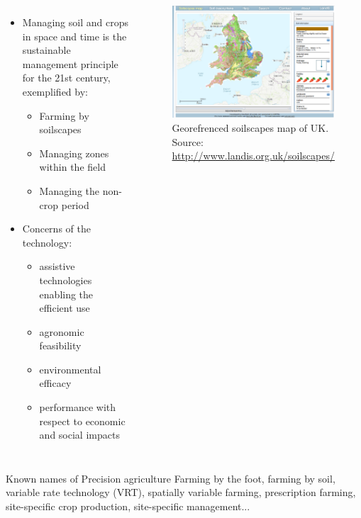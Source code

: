 \documentclass[11pt,dvipsnames,ignorenonframetext,aspectratio=169]{beamer}
\begin{document}
\begin{frame}{}
\protect\hypertarget{section-1}{}
\begin{columns}[T, onlytextwidth]
\begin{itemize}
\small
\item Managing soil and crops in space and time is the sustainable management principle for the 21st century, exemplified by:
  \begin{itemize}
  \footnotesize
  \item Farming by soilscapes
  \item Managing zones within the field
  \item Managing the non-crop period
  \end{itemize}
\item Concerns of the technology:
  \begin{itemize}
  \footnotesize
  \item assistive technologies enabling the efficient use
  \item agronomic feasibility
  \item environmental efficacy
  \item performance with respect to economic and social impacts
  \end{itemize}
\end{itemize}


\begin{figure}

{\centering \includegraphics[width=0.98\linewidth]{../images/soilscape_uk_2022-09-14 17-57-00} 

}

\caption{Georefrenced soilscapes map of UK. Source: \url{http://www.landis.org.uk/soilscapes/}}\label{fig:soilscape-uk}
\end{figure}
\end{columns}

\begin{block}{Known names of Precision agriculture}
Farming by the foot, farming by soil, variable rate technology (VRT), spatially variable farming, prescription farming, site-specific crop production, site-specific management...
\end{block}
\end{frame}
\end{document}
